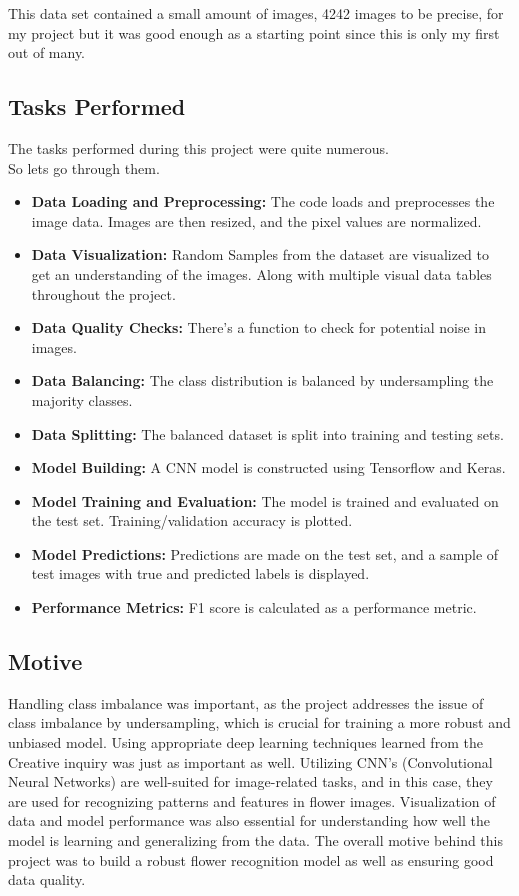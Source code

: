 \documentclass[paper=a4, fontsize=11pt,twoside]{scrartcl}
\begin{document}
This data set contained a small amount of images, 4242 images to be precise, for my project but it was good enough as a starting point since this is only my first out of many.  

\subsection{Tasks Performed}

The tasks performed during this project were quite numerous.\\ 
So lets go through them. 
\begin{itemize}
    \item \textbf{Data Loading and Preprocessing:} The code loads and preprocesses the image data. Images are then resized, and the pixel values are normalized. 
    \item \textbf{Data Visualization:} Random Samples from the dataset are visualized to get an understanding of the images. Along with multiple visual data tables throughout the project.  
    \item \textbf{Data Quality Checks:} There's a function to check for potential noise in images. 
    \item \textbf{Data Balancing:} The class distribution is balanced by undersampling the majority classes. 
    \item \textbf{Data Splitting:} The balanced dataset is split into training and testing sets.
    \item \textbf{Model Building:} A CNN model is constructed using Tensorflow and Keras. 
    \item \textbf{Model Training and Evaluation:} The model is trained and evaluated on the test set. Training/validation accuracy is plotted. 
    \item \textbf{Model Predictions:} Predictions are made on the test set, and a sample of test images with true and predicted labels is displayed. 
    \item \textbf{Performance Metrics:} F1 score is calculated as a performance metric. 
\end{itemize}

\subsection{Motive}

Handling class imbalance was important, as the project addresses the issue of class imbalance by undersampling, which is crucial for training a more robust and unbiased model. Using appropriate deep learning techniques learned from the Creative inquiry was just as important as well. Utilizing CNN's (Convolutional Neural Networks) are well-suited for image-related tasks, and in this case, they are used for recognizing patterns and features in flower images. Visualization of data and model performance was also essential for understanding how well the model is learning and generalizing from the data. The overall motive behind this project was to build a robust flower recognition model as well as ensuring good data quality.
\end{document}
